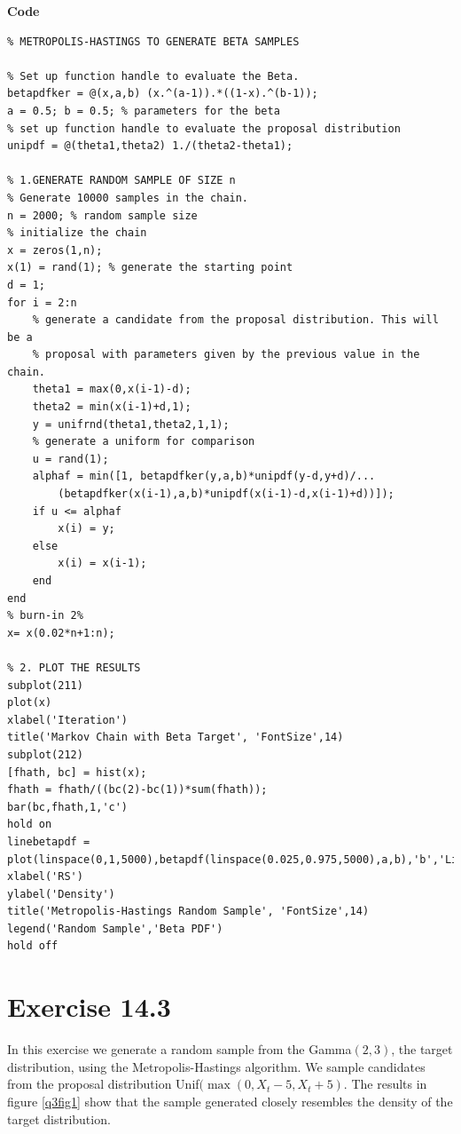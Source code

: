 \documentclass[12pt,a4paper]{article}
\begin{document}
\textbf{Code}
\begin{verbatim}
% METROPOLIS-HASTINGS TO GENERATE BETA SAMPLES

% Set up function handle to evaluate the Beta.
betapdfker = @(x,a,b) (x.^(a-1)).*((1-x).^(b-1));
a = 0.5; b = 0.5; % parameters for the beta
% set up function handle to evaluate the proposal distribution
unipdf = @(theta1,theta2) 1./(theta2-theta1);

% 1.GENERATE RANDOM SAMPLE OF SIZE n
% Generate 10000 samples in the chain.
n = 2000; % random sample size
% initialize the chain
x = zeros(1,n);
x(1) = rand(1); % generate the starting point
d = 1;
for i = 2:n
    % generate a candidate from the proposal distribution. This will be a
    % proposal with parameters given by the previous value in the chain.
    theta1 = max(0,x(i-1)-d);
    theta2 = min(x(i-1)+d,1);
    y = unifrnd(theta1,theta2,1,1);
    % generate a uniform for comparison
    u = rand(1);
    alphaf = min([1, betapdfker(y,a,b)*unipdf(y-d,y+d)/...
        (betapdfker(x(i-1),a,b)*unipdf(x(i-1)-d,x(i-1)+d))]);
    if u <= alphaf
        x(i) = y;
    else
        x(i) = x(i-1);
    end
end
% burn-in 2%
x= x(0.02*n+1:n);

% 2. PLOT THE RESULTS
subplot(211)
plot(x)
xlabel('Iteration')
title('Markov Chain with Beta Target', 'FontSize',14)
subplot(212)
[fhath, bc] = hist(x);
fhath = fhath/((bc(2)-bc(1))*sum(fhath));
bar(bc,fhath,1,'c')
hold on
linebetapdf = plot(linspace(0,1,5000),betapdf(linspace(0.025,0.975,5000),a,b),'b','LineWidth',2);
xlabel('RS')
ylabel('Density')
title('Metropolis-Hastings Random Sample', 'FontSize',14)
legend('Random Sample','Beta PDF')
hold off
\end{verbatim}
\clearpage

\section*{Exercise 14.3}
In this exercise we generate a random sample from the Gamma$(2,3)$, the target distribution, using the Metropolis-Hastings algorithm. We sample candidates from the proposal distribution Unif$(\max(0, X_t-5,X_t+5)$. The results in figure \ref{q3fig1} show that the sample generated closely resembles the density of the target distribution.
\end{document}
